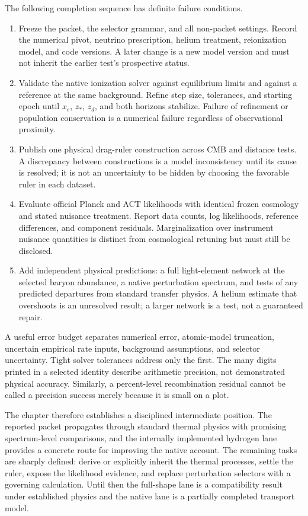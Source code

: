 The following completion sequence has definite failure conditions.
\begin{enumerate}
\item Freeze the packet, the selector grammar, and all non-packet settings. Record the numerical pivot, neutrino prescription, helium treatment, reionization model, and code versions. A later change is a new model version and must not inherit the earlier test's prospective status.
\item Validate the native ionization solver against equilibrium limits and against a reference at the same background. Refine step size, tolerances, and starting epoch until $x_e$, $z_*$, $z_d$, and both horizons stabilize. Failure of refinement or population conservation is a numerical failure regardless of observational proximity.
\item Publish one physical drag-ruler construction across CMB and distance tests. A discrepancy between constructions is a model inconsistency until its cause is resolved; it is not an uncertainty to be hidden by choosing the favorable ruler in each dataset.
\item Evaluate official Planck and ACT likelihoods with identical frozen cosmology and stated nuisance treatment. Report data counts, log likelihoods, reference differences, and component residuals. Marginalization over instrument nuisance quantities is distinct from cosmological retuning but must still be disclosed.
\item Add independent physical predictions: a full light-element network at the selected baryon abundance, a native perturbation spectrum, and tests of any predicted departures from standard transfer physics. A helium estimate that overshoots is an unresolved result; a larger network is a test, not a guaranteed repair.
\end{enumerate}

A useful error budget separates numerical error, atomic-model truncation, uncertain empirical rate inputs, background assumptions, and selector uncertainty. Tight solver tolerances address only the first. The many digits printed in a selected identity describe arithmetic precision, not demonstrated physical accuracy. Similarly, a percent-level recombination residual cannot be called a precision success merely because it is small on a plot.

The chapter therefore establishes a disciplined intermediate position. The reported packet propagates through standard thermal physics with promising spectrum-level comparisons, and the internally implemented hydrogen lane provides a concrete route for improving the native account. The remaining tasks are sharply defined: derive or explicitly inherit the thermal processes, settle the ruler, expose the likelihood evidence, and replace perturbation selectors with a governing calculation. Until then the full-shape lane is a compatibility result under established physics and the native lane is a partially completed transport model.

